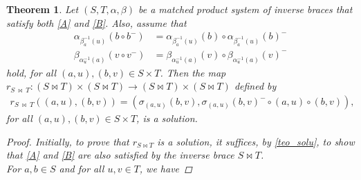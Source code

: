 \documentclass[preprint,1p]{elsarticle}
\newtheorem{theor}{Theorem}[section]
\theoremstyle{definition}               %
\newcommand{\alphaa}[3]{\alpha^{#1}_{#2}{#3}}
\begin{document}
\smallskip 


\begin{theor}\label{teo_match}
   Let $(S, T,\alpha,\beta)$ be a matched product system of inverse braces that satisfy both \eqref{A} and \eqref{B}. Also, assume that 
   \begin{align}\label{hp_match}
    \alpha_{\beta_a^{-1}(u)}\left(b \circ b^-\right)&=\alpha_{\beta_a^{-1}(u)}(b) \circ \alpha_{\beta_a^{-1}(u)}(b)^-\\
    \label{hp_match1} \beta_{\alpha_u^{-1}(a)}\left(v \circ v^-\right)&=\beta_{\alpha_u^{-1}(a)}(v) \circ \beta_{\alpha_u^{-1}(a)}(v)^-
   \end{align}
   hold, for all $(a, u), (b, v) \in S \times T$.
   Then the map $r_{S \ \bowtie \ T}: (S \bowtie T) \times (S \bowtie T) \to (S \bowtie T) \times (S \bowtie T)$ defined by
   \begin{align*}
 r_{S \ \bowtie \ T}\left(\left(a,u\right), \left(b, v\right) \right)=\left(\sigma_{(a,u)}(b, v), \sigma_{(a,u)}(b, v)^- \circ (a, u) \circ (b, v)\right),
   \end{align*}
   for all $(a, u), (b, v) \in S \times T$, is a solution.
   \begin{proof}
Initially, to prove that $r_{S \bowtie T}$ is a solution, it suffices, by \cref{teo_solu}, to show that \eqref{A} and \eqref{B} are also satisfied by the inverse brace $S \bowtie T$. \\
For $a,b \in S$ and for all $u,v \in T$, we have 

\end{proof}
\end{theor}
\end{document}
